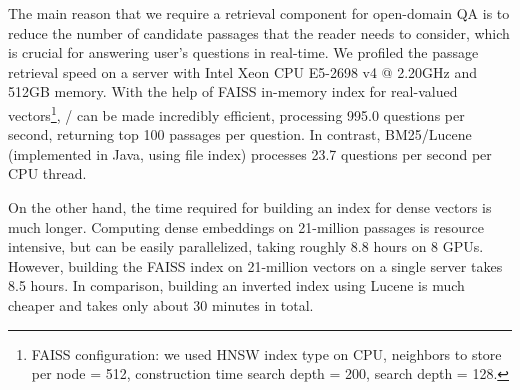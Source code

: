 The main reason that we require a retrieval component for open-domain QA is to reduce the number of candidate passages that the reader needs to consider, which is crucial for answering user's questions in real-time.
We profiled the passage retrieval speed on a server with Intel Xeon CPU E5-2698 v4 @ 2.20GHz and 512GB memory.
With the help of FAISS in-memory index for real-valued vectors\footnote{FAISS configuration: we used HNSW index type on CPU, neighbors to store per node = 512, construction time search depth = 200,  search depth = 128.}, \model/ can be made incredibly efficient, processing 995.0 questions per second, returning top 100 passages per question.
In contrast, BM25/Lucene (implemented in Java, using file index) processes 23.7 questions per second per CPU thread.

On the other hand, the time required for building an index for dense vectors is much longer.
Computing dense embeddings on 21-million passages is resource intensive, but can be easily parallelized, taking roughly 8.8 hours on 8 GPUs.
However, building the FAISS index on 21-million vectors on a single server takes 8.5 hours.
In comparison, building an inverted index using Lucene is much cheaper and takes only about 30 minutes in total.